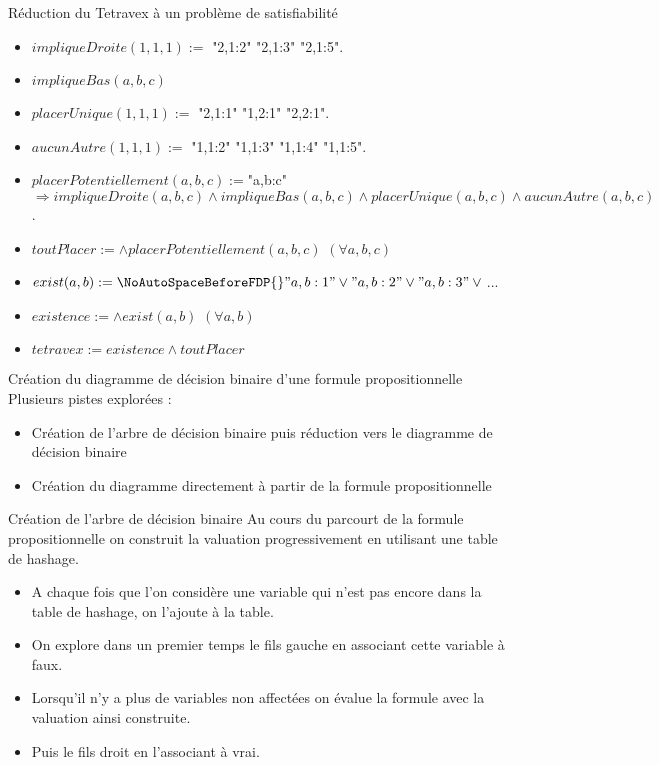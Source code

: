 \documentclass{beamer}
\begin{document}
\begin{frame}{Réduction du Tetravex à un problème de satisfiabilité}

{\small

    \begin{itemize}
        \item $impliqueDroite(1, 1, 1) :=$ {\NoAutoSpaceBeforeFDP{}"2,1:2" \lor{} "2,1:3" \lor{} "2,1:5"}.
        \item $impliqueBas(a, b, c)$
        \item $placerUnique(1, 1, 1) :=$ {\NoAutoSpaceBeforeFDP{} \neg "2,1:1" \land{} \neg "1,2:1" \land{} \neg "2,2:1"}.
        \item $aucunAutre(1, 1, 1) :=$ {\NoAutoSpaceBeforeFDP{} \neg "1,1:2" \land{} \neg "1,1:3" \land{} \neg "1,1:4" \land{} \neg "1,1:5"}.
        \item $placerPotentiellement(a, b, c) := ${\NoAutoSpaceBeforeFDP{}"a,b:c"}$ \Rightarrow{} impliqueDroite(a, b, c) \land{} impliqueBas(a, b, c) \land{} placerUnique(a, b, c) \land{} aucunAutre(a, b, c)$.
        \item $toutPlacer := \land{} placerPotentiellement(a, b, c)$ $(\forall{} a, b, c)$
        \item $exist(a, b) := {\NoAutoSpaceBeforeFDP{}"a,b:1" \lor{} "a,b:2" \lor{} "a,b:3" \lor{}}$...
        \item $existence := \land{} exist(a, b)$ $(\forall{} a, b)$
        \item $tetravex := existence \land{} toutPlacer$
    \end{itemize}
}

\end{frame}


\begin{frame}{Création du diagramme de décision binaire d'une formule propositionnelle}
Plusieurs pistes explorées :
\begin{itemize}
\item Création de l'arbre de décision binaire puis réduction vers le diagramme de décision binaire
\item Création du diagramme directement à partir de la formule propositionnelle
\end{itemize}
\end{frame}

\begin{frame}{Création de l'arbre de décision binaire}
Au cours du parcourt de la formule propositionnelle on construit la valuation progressivement en utilisant une table de hashage. 
\begin{itemize}
\item A chaque fois que l'on considère une variable qui n'est pas encore dans la table de hashage, on l'ajoute à la table.
\item On explore dans un premier temps le fils gauche en associant cette variable à faux.
\item Lorsqu'il n'y a plus de variables non affectées on évalue la formule avec la valuation ainsi construite.
\item Puis le fils droit en l'associant à vrai.
\end{itemize}
\end{frame}
\end{document}
